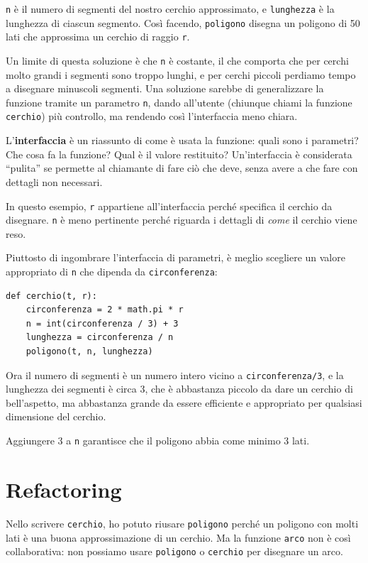 \documentclass[10pt]{book}
\begin{document}
{\tt n} è il numero di segmenti del nostro cerchio approssimato, e {\tt lunghezza} è la lunghezza di ciascun segmento. Così facendo, {\tt poligono} disegna un poligono di 50 lati che approssima un cerchio di raggio {\tt r}.

Un limite di questa soluzione è che {\tt n} è costante, il che comporta che per cerchi molto grandi i segmenti sono troppo lunghi, e per cerchi piccoli perdiamo tempo a disegnare minuscoli segmenti. Una soluzione sarebbe di generalizzare la funzione tramite un parametro {\tt n}, dando all'utente (chiunque chiami la funzione {\tt cerchio}) più controllo, ma rendendo così l'interfaccia meno chiara.

L'{\bf interfaccia} è un riassunto di come è usata la funzione: quali sono i parametri? Che cosa fa la funzione? Qual è il valore restituito? Un'interfaccia è considerata ``pulita'' se permette al chiamante di fare ciò che deve, senza avere a che fare con dettagli non necessari.

In questo esempio, {\tt r} appartiene all'interfaccia perché specifica il cerchio da disegnare. {\tt n} è meno pertinente perché riguarda i dettagli di {\em come} il cerchio viene reso.

Piuttosto di ingombrare l'interfaccia di parametri, è meglio scegliere un valore appropriato di {\tt n} che dipenda da {\tt circonferenza}:

\begin{verbatim}
def cerchio(t, r):
    circonferenza = 2 * math.pi * r
    n = int(circonferenza / 3) + 3
    lunghezza = circonferenza / n
    poligono(t, n, lunghezza)
\end{verbatim}
%
Ora il numero di segmenti è un numero intero vicino a {\tt circonferenza/3}, e la lunghezza dei segmenti è circa 3, che è abbastanza piccolo da dare un cerchio di bell'aspetto, ma abbastanza grande da essere efficiente e appropriato per qualsiasi dimensione del cerchio.

Aggiungere 3 a {\tt n} garantisce che il poligono abbia come minimo 3 lati.


\section{Refactoring}
\label{refactoring}

Nello scrivere {\tt cerchio}, ho potuto riusare {\tt poligono}
perché un poligono con molti lati è una buona approssimazione di un cerchio. Ma la funzione {\tt arco} non è così collaborativa: non possiamo usare {\tt poligono} o {\tt cerchio} per disegnare un arco.
\end{document}
